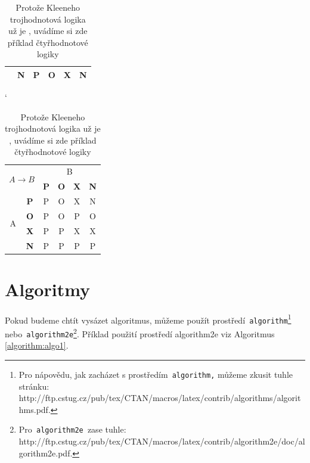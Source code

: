 \documentclass[a4paper, 11pt]{article}
\begin{document}
\begin{table}[h]
\begin{tabular}{|c|c|c|c|c|c|}
                                 & \textbf{N}      & P          & O          & X          & N          \\ \hline
    \end{tabular}
    \catcode`
    \begin{tabular}{|c|c|c|c|c|c|}
        \hline
        \multicolumn{2}{|c|}{\multirow{2}{*}{$A \rightarrow B$}} & \multicolumn{4}{c|}{B}                            \\ \cline{3-6} 
        \multicolumn{2}{|c|}{}                     & \textbf{P} & \textbf{O} & \textbf{X} & \textbf{N} \\ \hline
        \multirow{4}{*}{A}       & \textbf{P}      & P          & O          & X          & N          \\ \cline{2-6} 
                                 & \textbf{O}      & P          & O          & P          & O          \\ \cline{2-6} 
                                 & \textbf{X}      & P          & P          & X          & X          \\ \cline{2-6} 
                                 & \textbf{N}      & P          & P          & P          & P          \\ \hline
    \end{tabular}
    \caption{Protože Kleeneho trojhodnotová logika už je , uvádíme si zde
  příklad čtyřhodnotové logiky}
    \label{tab:logika}
\end{table}
\bigskip
\pagebreak

\section{Algoritmy}
\label{section:Algoritmy}
\noindent Pokud budeme chtít vysázet algoritmus, můžeme použít prostředí\verb| algorithm|\cprotect\footnote{Pro nápovědu, jak zacházet s prostředím\verb| algorithm,| můžeme zkusit tuhle stránku:\\
http://ftp.cstug.cz/pub/tex/CTAN/macros/latex/contrib/algorithms/algorithms.pdf.}
nebo\verb| algorithm2e|\cprotect\footnote{Pro\verb| algorithm2e |zase tuhle:
http://ftp.cstug.cz/pub/tex/CTAN/macros/latex/contrib/algorithm2e/doc/algorithm2e.pdf.}.
Příklad použití prostředí algorithm2e viz Algoritmus \ref{algorithm:algo1}.
\end{document}
